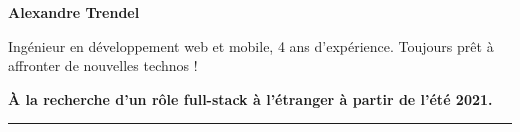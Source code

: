 \documentclass{cv}
\begin{document}
\pagestyle{empty}

\noindent\begin{minipage}[c]{.65\textwidth}
	\large
	\textbf{Alexandre Trendel}

	\smallskip

	Ingénieur en développement web et mobile, 4 ans d'expérience. Toujours prêt à affronter de nouvelles technos !

	\smallskip

	\textbf{À la recherche d'un rôle full-stack à l'étranger à partir de l'été 2021.}

	\color{solred}\rule{2cm}{1pt}

\end{minipage}%
\hfill
\begin{minipage}[c]{0.28\textwidth}%

	\centering

\end{minipage}	

\vspace{1cm}
\end{document}
